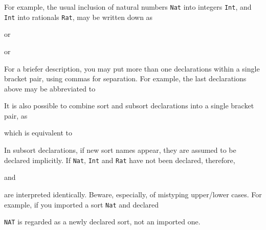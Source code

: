 \documentclass[a4paper]{memoir}
\begin{document}
For example, the usual inclusion of natural numbers \verb|Nat| into
integers \verb|Int|, and \verb|Int| into rationals \verb|Rat|, may be
written down as
\begin{vvtm}
\begin{ccode}
\end{ccode}
\end{vvtm}
or
\begin{vvtm}
\begin{ccode}
\end{ccode}
\end{vvtm}
or
\begin{vvtm}
\begin{ccode}
\end{ccode}
\end{vvtm}
For a briefer description, you may put more than one declarations within
a single bracket pair, using commas for separation. For example, the last
declarations above may be abbreviated to
\begin{vvtm}
\begin{ccode}
\end{ccode}
\end{vvtm}
It is also possible to combine sort and subsort declarations into a
single bracket pair, as
\begin{vvtm}
\begin{ccode}
\end{ccode}
\end{vvtm}
which is equivalent to
\begin{vvtm}
\begin{ccode}
\end{ccode}
\end{vvtm}
\begin{warning}
  In subsort declarations, if new sort names appear, they are
  assumed to be declared implicitly. If \texttt{Nat}, \texttt{Int} and
  \texttt{Rat} have not been declared, therefore,
  \begin{vvtm}
  \begin{ccode}
  \end{ccode}
  \end{vvtm}
  and
  \begin{vvtm}
  \begin{ccode}
  \end{ccode}
  \end{vvtm}
  are interpreted identically. Beware, especially, of mistyping
  upper/lower cases. For example, if you imported a sort
  \verb|Nat| and declared
  \begin{vvtm}
  \begin{ccode}
  \end{ccode}
  \end{vvtm}
  \verb|NAT| is regarded as a newly declared sort, not an imported
  one.
\end{warning}
\end{document}
